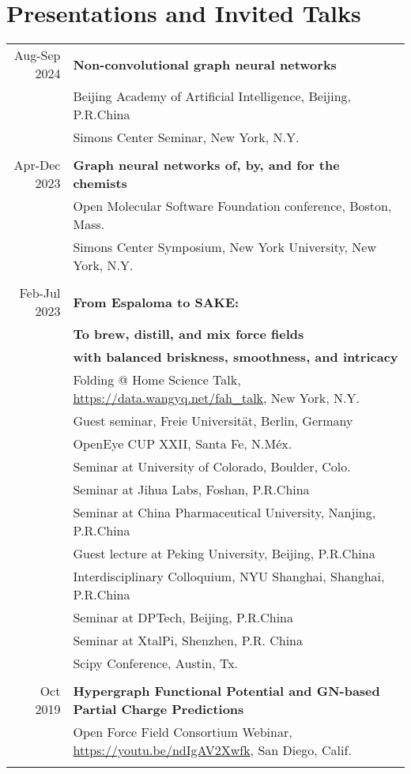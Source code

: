

\section{Presentations and Invited Talks}
\begin{tabular}{rl}
Aug-Sep 2024 & \textbf{Non-convolutional graph neural networks}\\
& Beijing Academy of Artificial Intelligence, Beijing, P.R.China\\
& Simons Center Seminar, New York, N.Y. \\\\



Apr-Dec 2023 & \textbf{Graph neural networks of, by, and for the chemists} \\
& Open Molecular Software Foundation conference, Boston, Mass.\\
& Simons Center Symposium, New York University, New York, N.Y.\\\\


Feb-Jul 2023 & \textbf{From Espaloma to SAKE: }\\
& \textbf{To brew, distill, and mix force fields} \\
& \textbf{with balanced briskness, smoothness, and intricacy}\\
& Folding @ Home Science Talk, \url{https://data.wangyq.net/fah_talk}, New York, N.Y. \\
& Guest seminar, Freie Universität, Berlin, Germany \\
& OpenEye CUP XXII, Santa Fe, N.Méx.\\
& Seminar at University of Colorado, Boulder, Colo.\\
& Seminar at Jihua Labs, Foshan, P.R.China\\
& Seminar at China Pharmaceutical University, Nanjing, P.R.China\\
& Guest lecture at Peking University, Beijing, P.R.China \\
& Interdisciplinary Colloquium, NYU Shanghai, Shanghai, P.R.China\\
& Seminar at DPTech, Beijing, P.R.China\\
& Seminar at XtalPi, Shenzhen, P.R. China\\
& Scipy Conference, Austin, Tx.\\\\

Oct 2019 & \textbf{Hypergraph Functional Potential and GN-based Partial Charge Predictions}\\
    & Open Force Field Consortium Webinar, \url{https://youtu.be/ndIgAV2Xwfk}, San Diego, Calif.\\\\


\end{tabular}
